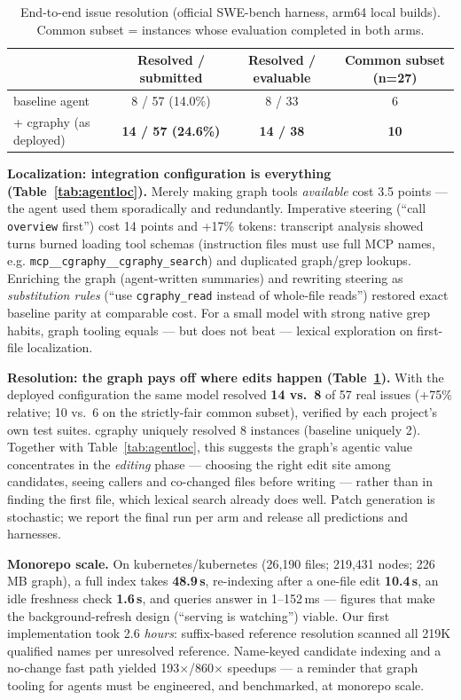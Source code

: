 \documentclass[11pt]{article}
\begin{document}
\begin{table}[t]
\centering
\caption{End-to-end issue resolution (official SWE-bench harness,
arm64 local builds). Common subset = instances whose evaluation completed
in both arms.}
\small
\begin{tabular}{lccc}
\toprule
 & Resolved / submitted & Resolved / evaluable & Common subset (n=27) \\
\midrule
baseline agent            & 8 / 57 (14.0\%) & 8 / 33 & 6 \\
+ cgraphy (as deployed)   & \textbf{14 / 57 (24.6\%)} & \textbf{14 / 38} & \textbf{10} \\
\bottomrule
\end{tabular}
\label{tab:resolution}
\end{table}

\textbf{Localization: integration configuration is everything
(Table~\ref{tab:agentloc}).} Merely making graph tools \emph{available}
cost 3.5 points --- the agent used them sporadically and redundantly.
Imperative steering (``call \texttt{overview} first'') cost 14 points and
+17\% tokens: transcript analysis showed turns burned loading tool schemas
(instruction files must use full MCP names, e.g.
\texttt{mcp\_\_cgraphy\_\_cgraphy\_search}) and duplicated graph/grep
lookups. Enriching the graph (agent-written summaries) and rewriting
steering as \emph{substitution rules} (``use \texttt{cgraphy\_read}
instead of whole-file reads'') restored exact baseline parity at
comparable cost. For a small model with strong native grep habits,
graph tooling equals --- but does not beat --- lexical exploration on
first-file localization.

\textbf{Resolution: the graph pays off where edits happen
(Table~\ref{tab:resolution}).} With the deployed configuration the same
model resolved \textbf{14 vs.\ 8} of 57 real issues (+75\% relative;
10 vs.\ 6 on the strictly-fair common subset), verified by each project's
own test suites. cgraphy uniquely resolved 8 instances (baseline uniquely
2). Together with Table~\ref{tab:agentloc}, this suggests the graph's
agentic value concentrates in the \emph{editing} phase --- choosing the
right edit site among candidates, seeing callers and co-changed files
before writing --- rather than in finding the first file, which lexical
search already does well. Patch generation is stochastic; we report the
final run per arm and release all predictions and harnesses.

\textbf{Monorepo scale.} On kubernetes/kubernetes (26{,}190 files;
219{,}431 nodes; 226\,MB graph), a full index takes \textbf{48.9\,s},
re-indexing after a one-file edit \textbf{10.4\,s}, an idle freshness
check \textbf{1.6\,s}, and queries answer in 1--152\,ms --- figures that
make the background-refresh design (``serving is watching'') viable. Our
first implementation took 2.6 \emph{hours}: suffix-based reference
resolution scanned all 219K qualified names per unresolved reference.
Name-keyed candidate indexing and a no-change fast path yielded
193$\times$/860$\times$ speedups --- a reminder that graph tooling for
agents must be engineered, and benchmarked, at monorepo scale.
\end{document}
